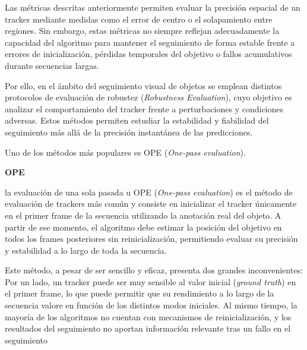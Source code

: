 Las métricas descritas anteriormente permiten evaluar la precisión espacial de un tracker mediante medidas como el error de centro o el solapamiento entre regiones. Sin embargo, estas métricas no siempre reflejan adecuadamente la capacidad del algoritmo para mantener el seguimiento de forma estable frente a errores de inicialización, pérdidas temporales del objetivo o fallos acumulativos durante secuencias largas.

Por ello, en el ámbito del seguimiento visual de objetos se emplean distintos protocolos de evaluación de robustez (\textit{Robustness Evaluation}), cuyo objetivo es analizar el comportamiento del tracker frente a perturbaciones y condiciones adversas. Estos métodos permiten estudiar la estabilidad y fiabilidad del seguimiento más allá de la precisión instantánea de las predicciones.

Uno de los métodos más populares es OPE (\textit{One-pass evaluation}).

\textbf{OPE}

 la evaluación de una sola pasada u OPE (\textit{One-pass evaluation}) es el método de evaluación de trackers más común y consiste en inicializar el tracker únicamente en el primer frame de la secuencia utilizando la anotación real del objeto. A partir de ese momento, el algoritmo debe estimar la posición del objetivo en todos los frames posteriores sin reinicialización, permitiendo evaluar su precisión y estabilidad a lo largo de toda la secuencia.

 Este método, a pesar de ser sencillo y eficaz, presenta dos grandes inconvenientes: Por un lado, un tracker puede ser muy sensible al valor inicial (\textit{ground truth}) en el primer frame, lo que puede permitir que su rendimiento a lo largo de la secuencia valore en función de los distintos modos iniciales. Al mismo tiempo, la mayoría de los algoritmos no cuentan con mecanismos de reinicialización, y los resultados del seguimiento no
aportan información relevante tras un fallo en el seguimiento



